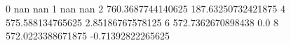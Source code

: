 0 nan nan
1 nan nan
2 760.3687744140625 187.63250732421875
4 575.588134765625 2.85186767578125
6 572.7362670898438 0.0
8 572.0223388671875 -0.71392822265625
